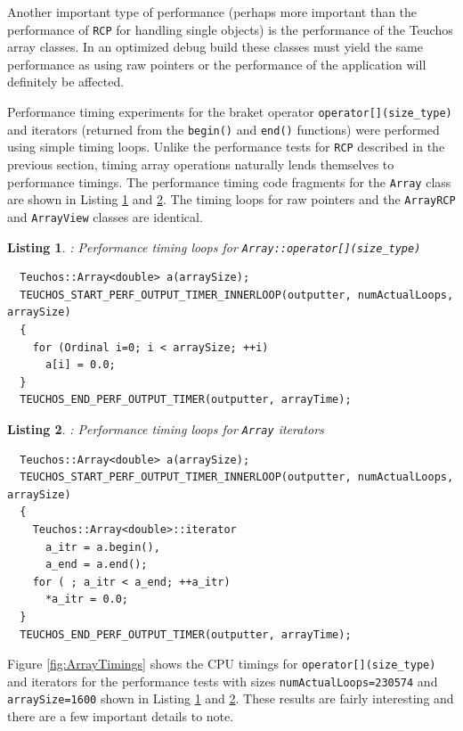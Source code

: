\documentclass[pdf,ps2pdf,11pt]{SANDreport}
\newtheorem{listing}{Listing}
\begin{document}
Another important type of performance (perhaps more important than the
performance of {}\texttt{RCP} for handling single objects) is the
performance of the Teuchos array classes.  In an optimized debug build
these classes must yield the same performance as using raw pointers or
the performance of the application will definitely be affected.

Performance timing experiments for the braket operator
{}\texttt{operator[](size\_type)} and iterators (returned from the
{}\texttt{begin()} and {}\texttt{end()} functions) were performed
using simple timing loops.  Unlike the performance tests for
{}\texttt{RCP} described in the previous section, timing array
operations naturally lends themselves to performance timings.  The
performance timing code fragments for the {}\texttt{Array} class are
shown in Listing {}\ref{listing:Array-bracket-timing} and
{}\ref{listing:Array-iterator-timing}.  The timing loops for raw
pointers and the {}\texttt{ArrayRCP} and {}\texttt{ArrayView} classes
are identical.


\begin{listing}: Performance timing loops for
{}\texttt{Array::operator[](size\_type)} \\
\label{listing:Array-bracket-timing}
{\small\begin{verbatim}
  Teuchos::Array<double> a(arraySize); 
  TEUCHOS_START_PERF_OUTPUT_TIMER_INNERLOOP(outputter, numActualLoops, arraySize) 
  { 
    for (Ordinal i=0; i < arraySize; ++i) 
      a[i] = 0.0; 
  }
  TEUCHOS_END_PERF_OUTPUT_TIMER(outputter, arrayTime); 
\end{verbatim}}
\end{listing}


\begin{listing}: Performance timing loops for {}\texttt{Array} iterators \\
\label{listing:Array-iterator-timing}
{\small\begin{verbatim}
  Teuchos::Array<double> a(arraySize); 
  TEUCHOS_START_PERF_OUTPUT_TIMER_INNERLOOP(outputter, numActualLoops, arraySize) 
  { 
    Teuchos::Array<double>::iterator 
      a_itr = a.begin(), 
      a_end = a.end(); 
    for ( ; a_itr < a_end; ++a_itr) 
      *a_itr = 0.0; 
  }
  TEUCHOS_END_PERF_OUTPUT_TIMER(outputter, arrayTime); 
\end{verbatim}}
\end{listing}


Figure {}\ref{fig:ArrayTimings} shows the CPU timings for
{}\texttt{operator[](size\_type)} and iterators for the performance
tests with sizes {}\texttt{numActualLoops=230574} and
{}\texttt{arraySize=1600} shown in Listing
{}\ref{listing:Array-bracket-timing} and
{}\ref{listing:Array-iterator-timing}.  These results are fairly
interesting and there are a few important details to note.
\end{document}
